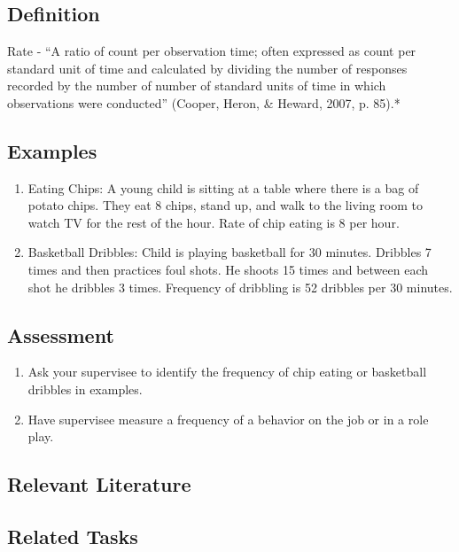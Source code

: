 \section{\fouraTwo{}}
%
%
\subsection{Definition}
Rate - ``A ratio of count per observation time; often expressed as count per standard unit of time and calculated by dividing the number of responses recorded by the number of number of standard units of time in which observations were conducted'' (Cooper, Heron, \& Heward, 2007, p. 85).*
%
\subsection{Examples}
\begin{enumerate}
\item    Eating Chips: A young child is sitting at a table where there is a bag of potato chips. They eat 8 chips, stand up, and walk to the living room to watch TV for the rest of the hour. Rate of chip eating is 8 per hour.
\item Basketball Dribbles: Child is playing basketball for 30 minutes. Dribbles 7 times and then practices foul shots. He shoots 15 times and between each shot he dribbles 3 times. Frequency of dribbling is 52 dribbles per 30 minutes.
\end{enumerate}

\subsection{Assessment} 
\begin{enumerate}
\item Ask your supervisee to identify the frequency of chip eating or basketball dribbles in examples.
\item Have supervisee measure a frequency of a behavior on the job or in a role play.
\end{enumerate}
%
\subsection{Relevant Literature}
\begin{refsection}
\nocite{catania2013learning,cooper2007applied}
\printbibliography[heading=none]
\end{refsection}

\subsection{Related Tasks}
\fouriOne{}\\
\fourhOne{}\\
\fourFKFourtySeven{}\\

